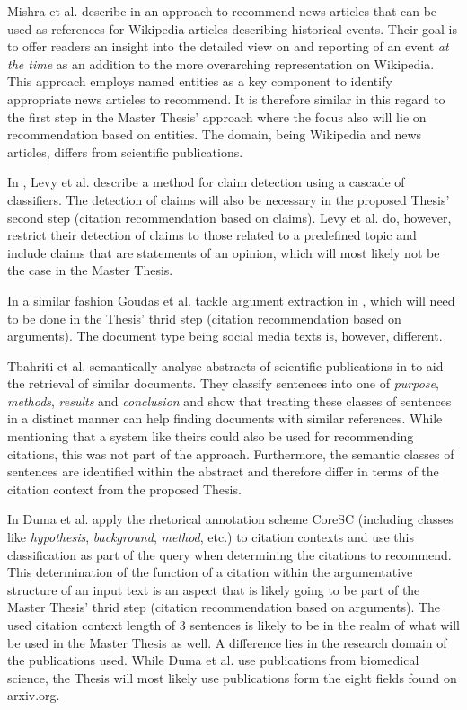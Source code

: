 \documentclass{proseminar}
\begin{document}
Mishra et al. describe in \cite{Mishra2016} an approach to recommend news articles that can be used as references for Wikipedia articles describing historical events. Their goal is to offer readers an insight into the detailed view on and reporting of an event \emph{at the time} as an addition to the more overarching representation on Wikipedia. This approach employs named entities as a key component to identify appropriate news articles to recommend. It is therefore similar in this regard to the first step in the Master Thesis' approach where the focus also will lie on recommendation based on entities. The domain, being Wikipedia and news articles, differs from scientific publications.

In \cite{Levy2014}, Levy et al. describe a method for claim detection using a cascade of classifiers. The detection of claims will also be necessary in the proposed Thesis' second step (citation recommendation based on claims). Levy et al. do, however, restrict their detection of claims to those related to a predefined topic and include claims that are statements of an opinion, which will most likely not be the case in the Master Thesis.

In a similar fashion Goudas et al. tackle argument extraction in \cite{Goudas2014}, which will need to be done in the Thesis' thrid step (citation recommendation based on arguments). The document type being social media texts is, however, different.

Tbahriti et al. semantically analyse abstracts of scientific publications in \cite{Tbahriti2006} to aid the retrieval of similar documents. They classify sentences into one of \emph{purpose}, \emph{methods}, \emph{results} and \emph{conclusion} and show that treating these classes of sentences in a distinct manner can help finding documents with similar references. While mentioning that a system like theirs could also be used for recommending citations, this was not part of the approach. Furthermore, the semantic classes of sentences are identified within the abstract and therefore differ in terms of the citation context from the proposed Thesis.

In \cite{Duma2016} Duma et al. apply the rhetorical annotation scheme CoreSC\cite{Liakata2010} (including classes like \emph{hypothesis}, \emph{background}, \emph{me\-thod}, etc.) to citation contexts and use this classification as part of the query when determining the citations to recommend. This determination of the function of a citation within the argumentative structure of an input text is an aspect that is likely going to be part of the Master Thesis' thrid step (citation recommendation based on arguments). The used citation context length of 3 sentences is likely to be in the realm of what will be used in the Master Thesis as well. A difference lies in the research domain of the publications used. While Duma et al. use publications from biomedical science, the Thesis will most likely use publications form the eight fields found on arxiv.org.
\end{document}
